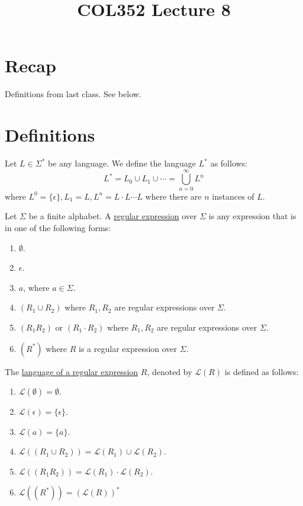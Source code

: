 \documentclass[a4paper]{article}
\title{\textbf{COL352 Lecture 8}}
\date{}
\newcommand{\mc}{\mathcal}
\renewcommand{\L}{\mc{L}}
\begin{document}
\maketitle
\tableofcontents

\section{Recap}

Definitions from last class. See below.

\section{Definitions}

\begin{defn}
	Let $L \in \Sigma^*$ be any language. We define the language $L^*$ as follows:
	\[
		L^* = L_0 \cup L_1 \cup \cdots = \bigcup_{n=0}^\infty L^n
	\]
	where $L^0 = \{\epsilon\}, L_1 = L, L^n = L\cdot L \cdots L$ where there are $n$ instances of $L$.
\end{defn}

\begin{defn}
	Let $\Sigma$ be a finite alphabet. A \underline{regular expression} over $\Sigma$ is any expression that is in one of the following forms:
	\begin{enumerate}
		\item $\emptyset$.
		\item $\epsilon$.
		\item $a$, where $a \in \Sigma$.
		\item $(R_1 \cup R_2)$ where $R_1, R_2$ are regular expressions over $\Sigma$.
		\item $(R_1R_2)$ or $(R_1 \cdot R_2)$ where $R_1, R_2$ are regular expressions over $\Sigma$.
		\item $(R^*)$ where $R$ is a regular expression over $\Sigma$.
	\end{enumerate}
\end{defn}

\begin{defn}
	The \underline{language of a regular expression} $R$, denoted by $\mc{L}(R)$ is defined as follows:
	\begin{enumerate}
		\item $\mc{L}(\emptyset) = \emptyset$.
		\item $\mc{L}(\epsilon) = \{\epsilon\}$.
		\item $\mc{L}(a) = \{a\}$.
		\item $\mc{L}((R_1 \cup R_2)) = \mc{L}(R_1) \cup \mc{L}(R_2)$.
		\item $\mc{L}((R_1R_2)) = \mc{L}(R_1) \cdot \L(R_2)$.
		\item $\mc{L}\left((R^*)\right) = \left(\mc{L}(R)\right)^*$
	\end{enumerate}
\end{defn}
\end{document}

